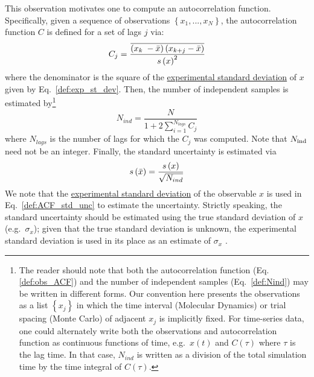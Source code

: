 This observation motivates one to compute an autocorrelation function.  Specifically, given a sequence of observations $\left\{x_1, ..., x_N\right\}$, the autocorrelation function $C$ is defined for a set of lags $j$ via:
%
\begin{equation}
  C_j = \dfrac{
   \overline{
      \left( x_{k{\color{white}j}}\hspace{-1pt} - \mean{x} \right)
      \left( x_{k+j} - \mean{x} \right)
    }
  }
  {\stdev{x}^2}
  \label{def:obs_ACF}
\end{equation}
%
where the denominator is the square of the \hyperref[def:exp_st_dev]{experimental standard deviation} of $x$ given by Eq.~\ref{def:exp_st_dev}.
Then, the number of independent samples is estimated by\footnote{The reader should note that both the autocorrelation function (Eq. \ref{def:obs_ACF}) and the number of independent samples (Eq.~\ref{def:Nind}) may be written in different forms\cite{Grossfield2009,Chodera-2016}. Our convention here presents the observations as a list $\left\{x_j\right\}$ in which the time interval (Molecular Dynamics) or trial spacing (Monte Carlo) of adjacent $x_j$ is implicitly fixed. For time-series data, one could alternately write both the observations and autocorrelation function as continuous functions of time, e.g.~$x\left(t\right)$ and $C\left(\tau\right)$ where $\tau$ is the lag time. In that case, $N_{ind}$ is written as a division of the total simulation time by the time integral of $C\left(\tau\right)$\cite{Grossfield2009}.}
%
\begin{equation}
  N_{ind} = \dfrac{N}{1+2 \sum_{i=1}^{N_{lags}} C_j}
  \label{def:Nind}
\end{equation}
%
where $N_{lags}$ is the number of lags for which the $C_j$ was computed.  Note that $N_{\rm ind}$ need not be an integer.
Finally, the standard uncertainty is estimated via
%
\begin{equation}
  s\left( \bar{x} \right) = \dfrac{s\left( x \right)}{\sqrt{N_{ind}}}
  \label{def:ACF_std_unc}
\end{equation}
%
We note that the \hyperref[def:exp_st_dev]{experimental standard deviation} of the observable $x$ is used in Eq.~\ref{def:ACF_std_unc} to estimate the uncertainty. Strictly speaking, the standard uncertainty should be estimated using the true standard deviation of $x$ (e.g.\ $\sigma_x$); given that the true standard deviation is unknown, the experimental standard deviation is used in its place as an estimate of $\sigma_x$ \cite{PatroneAIAA}.

